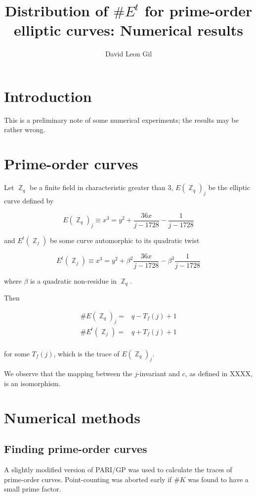 \documentclass[11pt,fleqn]{article}
\title{Distribution of $\#E^t$ for prime-order elliptic curves: Numerical results}
\author{David Leon Gil}
\newcommand{\Zq}{\ensuremath{\BbbZ_q}}
\newcommand{\Ej}{\ensuremath{E(\BbbZ_q)_j}}
\newcommand{\Ejt}{\ensuremath{E^t(\BbbZ_j)}}
\newcommand{\Tf}{\ensuremath{T_f(j)}}
\begin{document}
\section{Introduction}

This is a preliminary note of some numerical experiments; the results
may be rather wrong.

\section{Prime-order curves}

Let $\Zq$ be a finite field in characteristic greater than 3,
$\Ej$ be the elliptic curve defined by

\begin{equation}
\Ej \equiv x^3 = y^2 + \frac{36 x}{j - 1728} - \frac{1}{j - 1728}
\end{equation}

and $\Ejt$ be some curve automorphic to its quadratic twist

\begin{equation}
\Ejt \equiv x^3 = y^2 + \beta^2 \frac{36 x}{j - 1728} - \beta^3 \frac{1}{j - 1728}
\end{equation}

where $\beta$ is a quadratic non-residue in \Zq.

Then

\begin{equation}
\begin{aligned}
\#\Ej  =& q - \Tf + 1 \\
\#\Ejt =& q + \Tf + 1 \\
\end{aligned}
\end{equation}

for some \Tf, which is the trace of \Ej.

We observe that the mapping between the $j$-invariant and $c$, as
defined in XXXX, is an isomorphism.

\section{Numerical methods}

\subsection{Finding prime-order curves}

A slightly modified version of PARI/GP was used to calculate the
traces of prime-order curves. Point-counting was aborted early
if $\#K$ was found to have a small prime factor.
\end{document}
